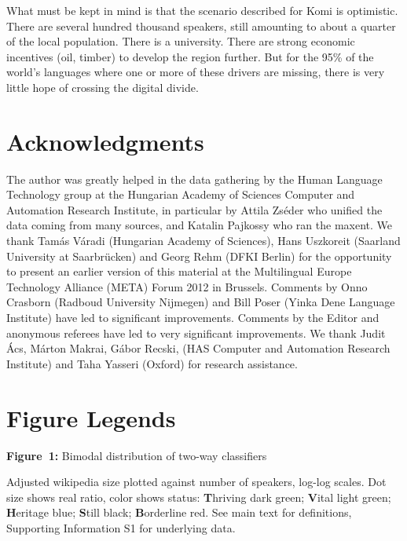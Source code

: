 \documentclass[10pt]{article}
\begin{document}
What must be kept in mind is that the scenario described for Komi is
optimistic. There are several hundred thousand speakers, still amounting to
about a quarter of the local population. There is a university. There are
strong economic incentives (oil, timber) to develop the region further. But
for the 95\% of the world's languages where one or more of these drivers are
missing, there is very little hope of crossing the digital divide.




\section*{Acknowledgments}

The author was greatly helped in the data gathering by the Human Language
Technology group at the Hungarian Academy of Sciences Computer and Automation
Research Institute, in particular by Attila Zs\'eder who unified the data
coming from many sources, and Katalin Pajkossy who ran the maxent.  We thank
Tam\'as V\'aradi (Hungarian Academy of Sciences), Hans Uszkoreit (Saarland
University at Saarbr\"ucken) and Georg Rehm (DFKI Berlin) for the opportunity
to present an earlier version of this material at the Multilingual Europe
Technology Alliance (META) Forum 2012 in Brussels. Comments by Onno Crasborn
(Radboud University Nijmegen) and Bill Poser (Yinka Dene Language Institute)
have led to significant improvements. {\color{black} Comments by the Editor and
  anonymous referees have led to very significant improvements.}  We thank
Judit \'Acs, M\'arton Makrai, G\'abor Recski, (HAS Computer and Automation
Research Institute) and Taha Yasseri (Oxford) for research assistance. %

\section*{Figure Legends}

\smallskip\noindent
{\bf Figure~1:} Bimodal distribution of two-way classifiers

\smallskip{} Adjusted wikipedia size plotted against
number of speakers, log-log scales.  Dot size shows real ratio, color shows
status: {\bf T}hriving dark green; {\bf V}ital light green; {\bf H}eritage
blue; {\bf S}till black; {\bf B}orderline red. See main text for definitions,
Supporting Information S1 for underlying data.
\end{document}
